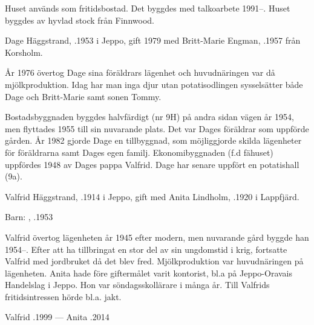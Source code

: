 Huset används som fritidsbostad. Det byggdes med talkoarbete 1991--. Huset byggdes av hyvlad stock från Finnwood.






Dage Häggstrand, .1953 i Jeppo, gift 1979 med Britt-Marie Engman, .1957 från Korsholm.
\begin{jhchildren}
  \item {}
  \item {}
\end{jhchildren}

År 1976 övertog Dage sina föräldrars lägenhet och huvudnäringen var då mjölkproduktion. Idag har man inga djur utan potatisodlingen sysselsätter både Dage och Britt-Marie samt sonen Tommy.

Bostadsbyggnaden byggdes halvfärdigt (nr 9H) på andra sidan vägen år 1954, men flyttades 1955 till sin nuvarande plats. Det var Dages föräldrar som uppförde gården. År 1982 gjorde Dage en tillbyggnad, som möjliggjorde skilda lägenheter för föräldrarna samt Dages egen familj. Ekonomibyggnaden (f.d fähuset) uppfördes 1948 av Dages pappa Valfrid. Dage har senare uppfört en potatishall (9a).


Valfrid Häggstrand, .1914 i Jeppo, gift med Anita Lindholm, .1920 i Lappfjärd.

Barn: , .1953

Valfrid övertog lägenheten år 1945 efter modern, men nuvarande gård byggde han 1954--. Efter att ha tillbringat en stor del av sin ungdomstid i krig, fortsatte Valfrid med jordbruket då det blev fred. Mjölkproduktion var huvudnäringen på lägenheten. Anita hade före giftermålet varit kontorist, bl.a på Jeppo-Oravais Handelslag i Jeppo. Hon var söndagsskollärare i många år. Till Valfrids fritidsintressen hörde bl.a. jakt.

Valfrid .1999  ---  Anita .2014



